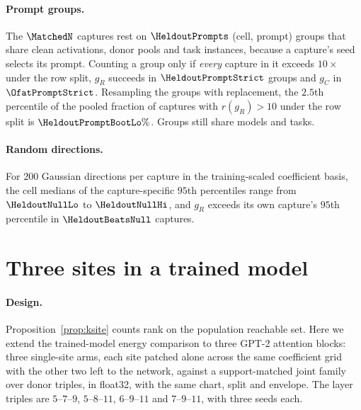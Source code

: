 \paragraph{Prompt groups.} The $\MatchedN$ captures rest on $\HeldoutPrompts$ (cell, prompt) groups that share clean
activations, donor pools and task instances, because a capture's seed selects its prompt. Counting a group only if \emph{every} capture in it exceeds
$10\times$ under the row split, $g_R$ succeeds in $\HeldoutPromptStrict$ groups and $g_C$ in $\OfatPromptStrict$.
Resampling the groups with replacement, the $2.5$th percentile of the pooled fraction of captures with
$r(g_R)>10$ under the row split is $\HeldoutPromptBootLo\%$. Groups still share models and tasks.

\paragraph{Random directions.} For $200$ Gaussian directions per capture in the training-scaled coefficient basis, the
cell medians of the capture-specific $95$th percentiles range from $\HeldoutNullLo$ to $\HeldoutNullHi$, and $g_R$
exceeds its own capture's $95$th percentile in $\HeldoutBeatsNull$ captures.

\section{Three sites in a trained model}
\label{app:three}

\paragraph{Design.} Proposition~\ref{prop:ksite} counts rank on the population reachable set. Here we extend the
trained-model energy comparison to three GPT-2 attention blocks: three single-site arms, each site patched alone across the same
coefficient grid with the other two left to the network, against a support-matched joint family over donor triples,
in float32, with the same chart, split and envelope. The layer triples are $5$--$7$--$9$, $5$--$8$--$11$,
$6$--$9$--$11$ and $7$--$9$--$11$, with three seeds each.


